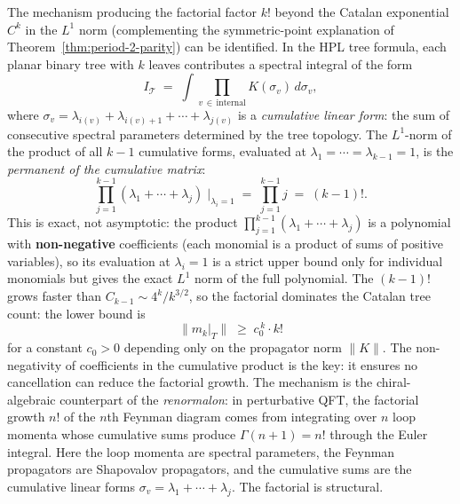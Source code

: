 \begin{remark}
\label{rem:gevrey-mechanism}%
%
%
%
The mechanism producing the factorial factor $k!$ beyond the
Catalan exponential $C^k$ in the $L^1$ norm (complementing
the symmetric-point explanation of
Theorem~\ref{thm:period-2-parity}) can be identified. In the HPL tree formula, each planar binary
tree with $k$ leaves contributes a spectral integral of the
form
\[
I_{\mathcal{T}}
\;=\;
\int \prod_{v\, \in\, \text{internal}} K(\sigma_v)\,
d\sigma_v,
\]
where $\sigma_v = \lambda_{i(v)} + \lambda_{i(v)+1} + \cdots +
\lambda_{j(v)}$ is a \emph{cumulative linear form}: the sum of
consecutive spectral parameters determined by the tree topology.
The $L^1$-norm of the product of all $k-1$ cumulative forms,
evaluated at $\lambda_1 = \cdots = \lambda_{k-1} = 1$, is the
\emph{permanent of the cumulative matrix}:
\begin{equation}\label{eq:cumulative-permanent}
\prod_{j=1}^{k-1}(\lambda_1 + \cdots + \lambda_j)
\;\Bigg|_{\lambda_i = 1}
\;=\;
\prod_{j=1}^{k-1} j
\;=\;
(k-1)!.
\end{equation}
This is exact, not asymptotic: the product
$\prod_{j=1}^{k-1}(\lambda_1 + \cdots + \lambda_j)$ is a
polynomial with \textbf{non-negative} coefficients
(each monomial is a product of sums of positive variables),
so its evaluation at $\lambda_i = 1$ is a strict upper bound
only for individual monomials but gives the exact $L^1$ norm
of the full polynomial. The $(k-1)!$ grows faster than
$C_{k-1} \sim 4^k/k^{3/2}$, so the factorial dominates
the Catalan tree count: the lower bound is
\begin{equation}\label{eq:gevrey-lower-bound}
\bigl\|m_k\big|_T\bigr\|
\;\ge\;
c_0^{\,k} \cdot k!
\end{equation}
for a constant $c_0 > 0$ depending only on the propagator
norm $\|K\|$. The non-negativity of coefficients in the
cumulative product is the key: it ensures no cancellation
can reduce the factorial growth. The mechanism is the
chiral-algebraic counterpart of the \emph{renormalon}: in
perturbative QFT, the factorial growth $n!$ of the $n$th
Feynman diagram comes from integrating over $n$ loop momenta
whose cumulative sums produce $\Gamma(n+1) = n!$ through the
Euler integral. Here the loop momenta are spectral parameters,
the Feynman propagators are Shapovalov propagators, and the
cumulative sums are the cumulative linear forms
$\sigma_v = \lambda_1 + \cdots + \lambda_j$. The factorial
is structural.
\end{remark}

